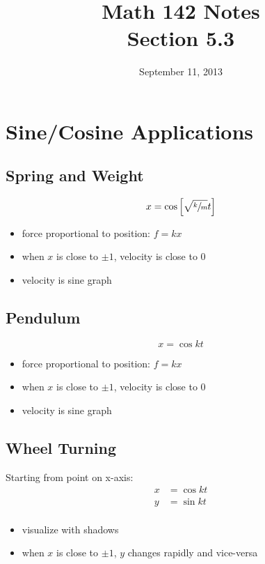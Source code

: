 \documentclass{exam}
\title{Math 142 Notes \\ Section 5.3}
\date{September 11, 2013}
\begin{document}
  \maketitle
  \tableofcontents

  \section{Sine/Cosine Applications}

  \subsection{Spring and Weight}
  \[
    x = \cos \left[ \sqrt{\sfrac{k}{m}} t \right]
  \]
  \begin{itemize}
    \item force proportional to position: $f = kx$
    \item when $x$ is close to $\pm 1$, velocity is close to $0$
    \item velocity is sine graph
  \end{itemize}

  \subsection{Pendulum}
  \[
    x = \cos kt 
  \]
  \begin{itemize}
    \item force proportional to position: $f = kx$
    \item when $x$ is close to $\pm 1$, velocity is close to $0$
    \item velocity is sine graph
  \end{itemize}

  \subsection{Wheel Turning}
  Starting from point on x-axis:
  \begin{align*}
    x &= \cos kt \\
    y &= \sin kt \\
  \end{align*}

  \begin{itemize}
    \item visualize with shadows
    \item when $x$ is close to $\pm 1$, $y$ changes rapidly and vice-versa
  \end{itemize}
\end{document}
